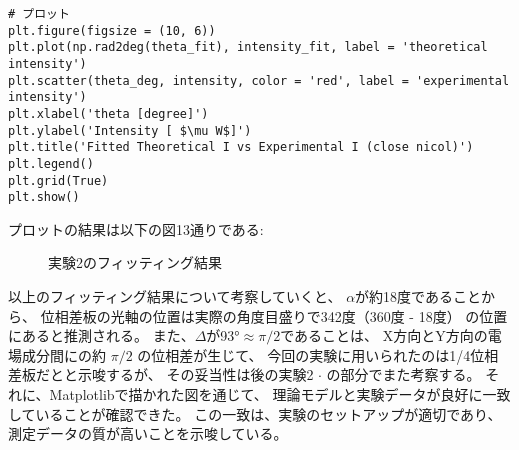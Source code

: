 \documentclass{article}
\begin{document}
\begin{spacing}{1.2}
\begin{lstlisting}
# プロット
plt.figure(figsize = (10, 6))
plt.plot(np.rad2deg(theta_fit), intensity_fit, label = 'theoretical intensity')
plt.scatter(theta_deg, intensity, color = 'red', label = 'experimental intensity')
plt.xlabel('theta [degree]')
plt.ylabel('Intensity [ $\mu W$]')
plt.title('Fitted Theoretical I vs Experimental I (close nicol)')
plt.legend()
plt.grid(True)
plt.show()
\end{lstlisting}

    \noindent
    プロットの結果は以下の図13通りである:

\begin{figure}[!htb] %
    \centering
    \caption{実験2のフィッティング結果}
    \label{fig:13}
\end{figure}
\FloatBarrier
    以上のフィッティング結果について考察していくと、
    $\alpha$が約18度であることから、
    位相差板の光軸の位置は実際の角度目盛りで342度（360度 - 18度）
    の位置にあると推測される。
    また、$\Delta$が93°$\approx \pi/2$であることは、
    X方向とY方向の電場成分間にの約 $\pi/2$ の位相差が生じて、
    今回の実験に用いられたのは1/4位相差板だとと示唆するが、
    その妥当性は後の実験2 $\cdot$ の部分でまた考察する。
    それに、Matplotlibで描かれた図を通じて、
    理論モデルと実験データが良好に一致していることが確認できた。
    この一致は、実験のセットアップが適切であり、
    測定データの質が高いことを示唆している。
\end{spacing}
\end{document}
